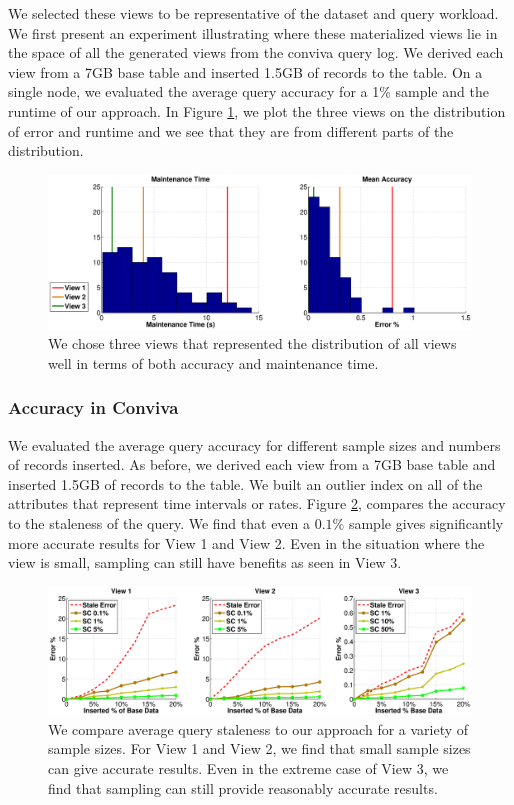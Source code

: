 We selected these views to be representative of the dataset and query workload. 
We first present an experiment illustrating where these materialized views lie in the space of all the generated views from the conviva query log.
We derived each view from a 7GB base table and inserted 1.5GB of records to the table. 
On a single node, we evaluated the average query accuracy for a 1\% sample and the runtime of our approach.
In Figure \ref{exp12conviva}, we plot the three views on the distribution of error and runtime and we see that they 
are from different parts of the distribution.
\begin{figure}[ht!]
\label{exp12conviva}
\hspace{-3.5em}
\includegraphics[scale=0.23]{exp/conviva_efficiency_accuracy.eps}
 \caption{We chose three views that represented the distribution of all views well in terms of both accuracy and maintenance time.}
\end{figure}

\subsubsection{Accuracy in Conviva}
We evaluated the average query accuracy for different sample sizes and numbers of records inserted.
As before, we derived each view from a 7GB base table and inserted 1.5GB of records to the table. 
We built an outlier index on all of the attributes that represent time intervals or rates.
Figure \ref{exp5conviva}, compares the accuracy to the staleness of the query.
We find that even a $0.1\%$ sample gives significantly more accurate results for View 1 and View 2.
Even in the situation where the view is small, sampling can still have benefits as seen in View 3.

\begin{figure}[ht!]
\label{exp5conviva}
\hspace{-3.5em}
\includegraphics[scale=0.22]{exp/exp5-coniva-accuracy-woutlier.eps}
 \caption{We compare average query staleness to our approach for a variety of sample sizes. For View 1 and View 2, we find that small sample sizes can give accurate results. Even in the extreme case of View 3, we find that sampling can still provide reasonably accurate results.}
\end{figure}

